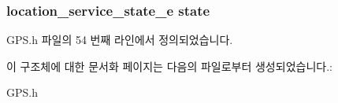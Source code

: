 \hypertarget{struct_g_p_s_extends_ad003a392ffec4bbd3a2839bb4e042e56}{
\subsubsection[{state}]{\setlength{\rightskip}{0pt plus 5cm}location\-\_\-service\-\_\-state\-\_\-e state}}\label{struct_g_p_s_extends_ad003a392ffec4bbd3a2839bb4e042e56}


G\-P\-S.\-h 파일의 54 번째 라인에서 정의되었습니다.



이 구조체에 대한 문서화 페이지는 다음의 파일로부터 생성되었습니다.\-:\begin{DoxyCompactItemize}
\item 
G\-P\-S.\-h\end{DoxyCompactItemize}
